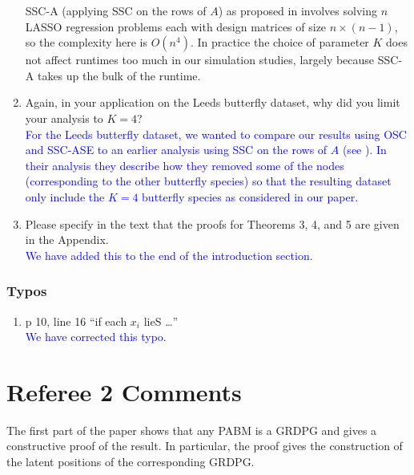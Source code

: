 \documentclass[
]{article}
\providecommand{\tightlist}{%
  \setlength{\itemsep}{0pt}\setlength{\parskip}{0pt}}
\begin{document}
\begin{enumerate}
{  SSC-A (applying SSC on the rows of $A$) as proposed in \cite{noroozi2019estimation} involves solving $n$ LASSO regression problems each with design matrices of size $n \times (n - 1)$, so the complexity here is $O(n^4)$. 
  In practice the choice of parameter $K$ does not affect
  runtimes too much in our simulation studies, 
  largely because SSC-A takes up the bulk of the runtime. 
  }
\item
  Again, in your application on the Leeds butterfly dataset, why did you
  limit your analysis to \(K = 4\)?\\
  \textcolor{blue}{
  For the Leeds butterfly dataset, we wanted to compare our results
  using OSC and SSC-ASE to an earlier analysis using SSC on the rows of
  $A$ (see \citep{noroozi2019estimation}). In their analysis they
  describe how they removed some of the nodes (corresponding to the
  other butterfly species) so that the resulting dataset only include the
  $K = 4$ butterfly species as considered in our paper.}
\item
  Please specify in the text that the proofs for Theorems 3, 4, and 5
  are given in the Appendix.\\
  \textcolor{blue}{
  We have added this to the end of the introduction section.
  }
\end{enumerate}

\hypertarget{typos}{%
\subsubsection{Typos}\label{typos}}

\begin{enumerate}
\def\labelenumi{\arabic{enumi}.}
\tightlist
\item
  p 10, line 16 ``if each \(x_i\) lieS \ldots{}''\\
  \textcolor{blue}{
  We have corrected this typo. 
  }
\end{enumerate}

\hypertarget{referee-2-comments}{%
\section{Referee 2 Comments}\label{referee-2-comments}}

The first part of the paper shows that any PABM is a GRDPG and gives a
constructive proof of the result. In particular, the proof gives the
construction of the latent positions of the corresponding GRDPG.
\end{document}
